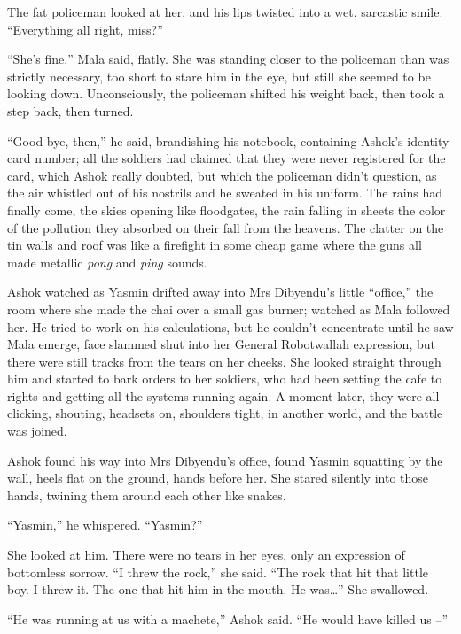 The fat policeman looked at her, and his lips twisted into a wet,
sarcastic smile. ``Everything all right, miss?''

``She's fine,'' Mala said, flatly. She was standing closer to the
policeman than was strictly necessary, too short to stare him in
the eye, but still she seemed to be looking down. Unconsciously,
the policeman shifted his weight back, then took a step back, then
turned.

``Good bye, then,'' he said, brandishing his notebook, containing
Ashok's identity card number; all the soldiers had claimed that
they were never registered for the card, which Ashok really
doubted, but which the policeman didn't question, as the air
whistled out of his nostrils and he sweated in his uniform. The
rains had finally come, the skies opening like floodgates, the rain
falling in sheets the color of the pollution they absorbed on their
fall from the heavens. The clatter on the tin walls and roof was
like a firefight in some cheap game where the guns all made
metallic \emph{pong} and \emph{ping} sounds.

Ashok watched as Yasmin drifted away into Mrs Dibyendu's little
``office,'' the room where she made the chai over a small gas burner;
watched as Mala followed her. He tried to work on his calculations,
but he couldn't concentrate until he saw Mala emerge, face slammed
shut into her General Robotwallah expression, but there were still
tracks from the tears on her cheeks. She looked straight through
him and started to bark orders to her soldiers, who had been
setting the cafe to rights and getting all the systems running
again. A moment later, they were all clicking, shouting, headsets
on, shoulders tight, in another world, and the battle was joined.

Ashok found his way into Mrs Dibyendu's office, found Yasmin
squatting by the wall, heels flat on the ground, hands before her.
She stared silently into those hands, twining them around each
other like snakes.

``Yasmin,'' he whispered. ``Yasmin?''

She looked at him. There were no tears in her eyes, only an
expression of bottomless sorrow. ``I threw the rock,'' she said. ``The
rock that hit that little boy. I threw it. The one that hit him in
the mouth. He was\ldots{}'' She swallowed.

``He was running at us with a machete,'' Ashok said. ``He would have
killed us --''

